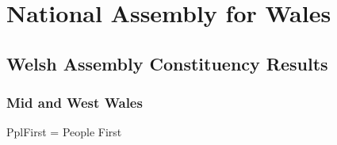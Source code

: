 \part{National Assembly for Wales}

\chapter{Welsh Assembly Constituency Results}

\section{Mid and West Wales}

%

PplFirst = People First

